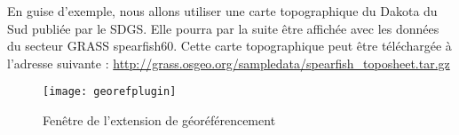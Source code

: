 
En guise d'exemple, nous allons utiliser une carte topographique du Dakota du Sud publiée par le SDGS.
Elle pourra par la suite être affichée avec les données du secteur GRASS spearfish60. Cette carte topographique peut être téléchargée à l'adresse suivante : \url{http://grass.osgeo.org/sampledata/spearfish\_toposheet.tar.gz}


\begin{figure}[ht]
\begin{center}
  \texttt{[image: georefplugin]}
  \caption{Fenêtre de l'extension de géoréférencement \nixcaption}\label{fig:georefplugin}
\end{center}
\end{figure}

\label{georeferencer_entering}

